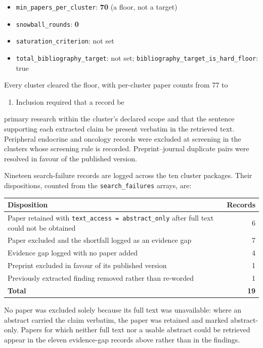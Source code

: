 \documentclass[11pt]{article}
\begin{document}
\begin{itemize}
\item \texttt{min\_papers\_per\_cluster}: \textbf{70} (a floor, not a target)
\item \texttt{snowball\_rounds}: \textbf{0}
\item \texttt{saturation\_criterion}: not set
\item \texttt{total\_bibliography\_target}: not set; \texttt{bibliography\_target\_is\_hard\_floor}: true
\end{itemize}

Every cluster cleared the floor, with per-cluster paper counts from 77 to

\begin{enumerate}
\item Inclusion required that a record be
\end{enumerate}

primary research within the cluster's declared scope and that the sentence supporting each extracted claim be present verbatim in the retrieved text. Peripheral endocrine and oncology records were excluded at screening in the clusters whose screening rule is recorded. Preprint--journal duplicate pairs were resolved in favour of the published version.

Nineteen search-failure records are logged across the ten cluster packages. Their dispositions, counted from the \texttt{search\_failures} arrays, are:

\begin{table}[H]
\centering
\small
\begin{tabular}{lr}
\toprule
\textbf{Disposition} & \textbf{Records} \\
\midrule
Paper retained with \texttt{text\_access = abstract\_only} after full text could not be obtained & 6 \\
Paper excluded and the shortfall logged as an evidence gap & 7 \\
Evidence gap logged with no paper added & 4 \\
Preprint excluded in favour of its published version & 1 \\
Previously extracted finding removed rather than re-worded & 1 \\
\textbf{Total} & \textbf{19} \\
\bottomrule
\end{tabular}
\end{table}

No paper was excluded solely because its full text was unavailable: where an abstract carried the claim verbatim, the paper was retained and marked abstract-only. Papers for which neither full text nor a usable abstract could be retrieved appear in the eleven evidence-gap records above rather than in the findings.
\end{document}
